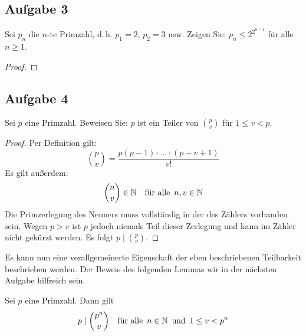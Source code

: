 \newpage
\subsection{Aufgabe 3}
Sei $p_n$ die $n$-te Primzahl, d.\,h. $p_1 = 2$, $p_2 = 3$ usw. Zeigen Sie:
$p_n \leq 2^{2^{n - 1}}$ für alle $n \geq 1$.
\begin{proof}
\end{proof}

\newpage
\subsection{Aufgabe 4}
Sei $p$ eine Primzahl. Beweisen Sie: $p$ ist ein Teiler von $\binom{p}{v}$
für $1 \leq v < p$.
\begin{proof}
  Per Definition gilt:
  \begin{equation*}
    \binom{p}{v} = \frac{p(p-1) \cdot \ldots \cdot (p - v + 1)}{v!}
  \end{equation*}
  Es gilt außerdem:
  \begin{equation*}
    \binom{n}{v} \in \mathbb{N}{} \quad
    \text{für alle} \enspace n,v \in \mathbb{N}{}
  \end{equation*}
  Die Primzerlegung des Nenners muss
  vollständig in der des Zählers vorhanden sein.
  Wegen $p > v$ ist $p$ jedoch niemals Teil dieser Zerlegung und
  kann im Zähler nicht gekürzt werden.
  Es folgt $p \mid \binom{p}{v}$.
\end{proof}
\noindent
Es kann nun eine verallgemeinerte Eigenschaft der eben beschriebenen
Teilbarkeit beschrieben werden. Der Beweis des folgenden Lemmas wir
in der nächsten Aufgabe hilfreich sein.
\begin{lemma}
  \label{lemma:p_divides_binom}
  Sei $p$ eine Primzahl. Dann gilt
  \begin{equation*}
    p \mid \binom{p^n}{v} \quad \text{für alle} \enspace n \in \mathbb{N}{}
    \enspace \text{und} \enspace 1 \leq v < p^n
  \end{equation*}
\end{lemma}
